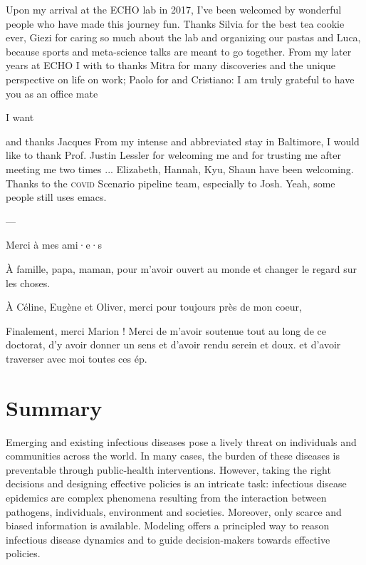  Upon my arrival at the ECHO lab in 2017, I've been welcomed by wonderful people who have made this journey fun. Thanks Silvia for the best tea cookie ever, Giezi for caring so much about the lab and organizing our pastas and Luca, because sports and meta-science talks are meant to go together. From my later years at ECHO I with to thanks Mitra for many discoveries and the unique perspective on life on work; Paolo for and Cristiano: I am truly grateful to have you as an office mate
 
 I want 
 
 and thanks Jacques
 From my intense and abbreviated stay in Baltimore, I would like to thank Prof. Justin Lessler for welcoming me and for trusting me after meeting me two times ... Elizabeth, Hannah, Kyu, Shaun have been welcoming. Thanks to the \textsc{covid} Scenario pipeline team, especially to Josh.  Yeah, some people still uses emacs.
 
 --- 
 
 Merci à mes ami·e·s

À famille, papa, maman, pour m'avoir ouvert au monde et changer le regard sur les choses.

À Céline, Eugène et Oliver, merci pour toujours près de mon coeur, 

Finalement, merci Marion ! Merci de m'avoir soutenue tout au long de ce doctorat, d'y avoir donner un sens et d'avoir rendu  serein et doux. 
 et d'avoir traverser avec moi toutes ces ép.  
 
 \chapter*{Summary} %
Emerging and existing infectious diseases pose a lively threat on individuals and communities across the world. In many cases, the burden of these diseases is preventable through public-health interventions. However, taking the right decisions and designing effective policies is an intricate task: infectious disease epidemics are complex phenomena resulting from the interaction between pathogens, individuals, environment and societies. Moreover, only scarce and biased information is available. Modeling offers a principled way to reason infectious disease dynamics and to guide decision-makers towards effective policies. 

